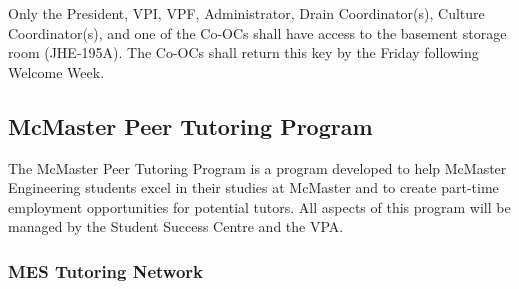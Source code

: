 Only the President, VPI, VPF, Administrator, Drain Coordinator(s),
Culture Coordinator(s), and one of the Co-OCs shall have access to the
basement storage room (JHE-195A). The Co-OCs shall return this key by
the Friday following Welcome Week.

\hypertarget{mcmaster-peer-tutoring-program}{%
 \subsection{McMaster Peer Tutoring
  Program}
 \label{mcmaster-peer-tutoring-program}}

The McMaster Peer Tutoring Program is a program developed to help
McMaster Engineering students excel in their studies at McMaster and to
create part-time employment opportunities for potential tutors. All
aspects of this program will be managed by the Student Success Centre
and the VPA.

\hypertarget{mes-tutoring-network}{%
 \subsubsection{MES Tutoring Network}
 \label{mes-tutoring-network}}

